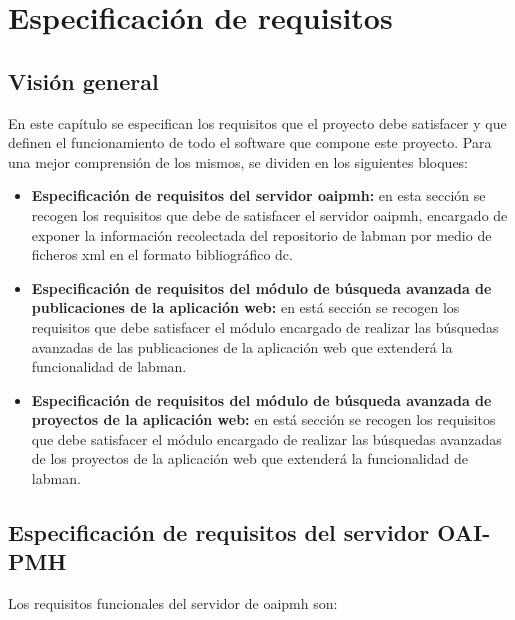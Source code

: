 \chapter{Especificación de requisitos}

\section{Visión general}

En este capítulo se especifican los requisitos que el proyecto debe satisfacer y que definen el funcionamiento de todo el software que compone este proyecto. Para una mejor comprensión de los mismos, se dividen en los siguientes bloques:

\begin{itemize}
	\item \textbf{Especificación de requisitos del servidor \acrshort{oaipmh}:} en esta sección se recogen los requisitos que debe de satisfacer el servidor \acrshort{oaipmh}, encargado de exponer la información recolectada del repositorio de \acrshort{labman} por medio de ficheros \acrshort{xml} en el formato bibliográfico \acrshort{dc}.

	\item \textbf{Especificación de requisitos del módulo de búsqueda avanzada de publicaciones de la aplicación web:} en está sección se recogen los requisitos que debe satisfacer el módulo encargado de realizar las búsquedas avanzadas de las publicaciones de la aplicación web que extenderá la funcionalidad de \acrshort{labman}.

	\item \textbf{Especificación de requisitos del módulo de búsqueda avanzada de proyectos de la aplicación web:} en está sección se recogen los requisitos que debe satisfacer el módulo encargado de realizar las búsquedas avanzadas de los proyectos de la aplicación web que extenderá la funcionalidad de \acrshort{labman}.
\end{itemize}

\section{Especificación de requisitos del servidor OAI-PMH}

Los requisitos funcionales del servidor de \acrshort{oaipmh} son:

